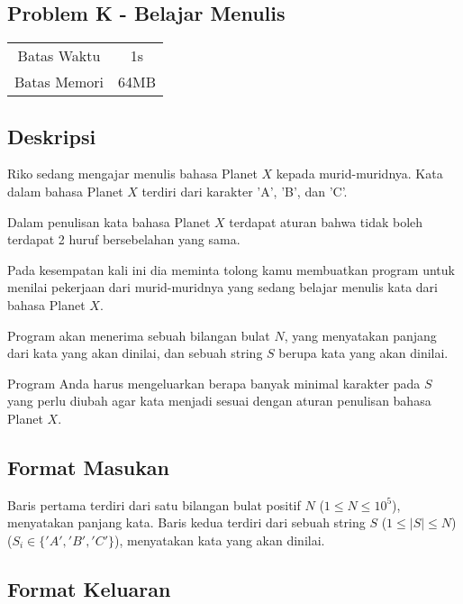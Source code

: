 \documentclass{article}
\begin{document}
\begin{center}
    \section*{Problem K - Belajar Menulis} %

    \begin{tabular}{ | c c | }
        \hline
        Batas Waktu  & 1s \\    %
        Batas Memori & 64MB \\  %
        \hline
    \end{tabular}
\end{center}

\subsection*{Deskripsi}

Riko sedang mengajar menulis bahasa Planet $X$ kepada murid-muridnya. Kata dalam bahasa Planet $X$ terdiri dari karakter 'A', 'B', dan 'C'.

Dalam penulisan kata bahasa Planet $X$ terdapat aturan bahwa tidak boleh terdapat 2 huruf bersebelahan yang sama.

Pada kesempatan kali ini dia meminta tolong kamu membuatkan program untuk menilai pekerjaan dari murid-muridnya yang sedang belajar menulis kata dari bahasa Planet $X$.

Program akan menerima sebuah bilangan bulat $N$, yang menyatakan panjang dari kata yang akan dinilai, dan sebuah string $S$ berupa kata yang akan dinilai.

Program Anda harus mengeluarkan berapa banyak minimal karakter pada $S$ yang perlu diubah agar kata menjadi sesuai dengan aturan penulisan bahasa Planet $X$.

\subsection*{Format Masukan}

Baris pertama terdiri dari satu bilangan bulat positif $N$ ($1 \leq N \leq 10^5$), menyatakan panjang kata.
Baris kedua terdiri dari sebuah string $S$
($1 \leq |S| \leq N$) ($S_i \in \{'A', 'B', 'C'\}$), menyatakan kata yang akan dinilai. 

\subsection*{Format Keluaran}
\end{document}
